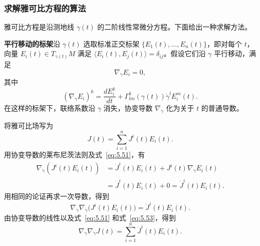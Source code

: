 \subsubsection{求解雅可比方程的算法}
雅可比方程是沿测地线 $\gamma(t)$ 的二阶线性常微分方程。下面给出一种求解方法。

\textbf{平行移动的标架}\quad 沿 $\gamma(t)$ 选取标准正交标架 $\{E_1(t),\ldots,E_n(t)\}$，即对每个 $t$，向量 $E_i(t)\in T_{\gamma(t)}M$ 满足 $\langle E_i(t),E_j(t)\rangle=\delta_{ij}$。假设它们沿 $\gamma$ 平行移动，满足
\begin{equation*}
  \nabla_{\dot\gamma}E_i=0,
  \tag{5.51}\label{eq:5.51}
\end{equation*}
其中
\[
  (\nabla_{\dot\gamma}E_i)^k
    =\frac{dE_i^k}{dt}+\Gamma^k_{lm}(\gamma(t))\dot\gamma^l E_i^m(t).
\]
在这样的标架下，联络系数沿 $\gamma$ 消失，协变导数 $\nabla_{\dot\gamma}$ 化为关于 $t$ 的普通导数。

将雅可比场写为
\begin{equation*}
  J(t)=\sum_{i=1}^n J^i(t)E_i(t).
  \tag{5.52}\label{eq:5.52}
\end{equation*}
用协变导数的莱布尼茨法则及式~\eqref{eq:5.51}，有
\[
  \begin{aligned}
    \nabla_{\dot\gamma}(J^i(t)E_i(t))
       &=\dot J^i(t)E_i(t)+J^i(t)\nabla_{\dot\gamma}E_i(t)\\
       &=\dot J^i(t)E_i(t)+0=\dot J^i(t)E_i(t).
  \end{aligned}
\]
用相同的论证再求一次导数，得到
\begin{equation*}
  \nabla_{\dot\gamma}\nabla_{\dot\gamma}\bigl(J^i(t)E_i(t)\bigr)
     =\ddot J^i(t)E_i(t).
  \tag{5.53}\label{eq:5.53}
\end{equation*}
由协变导数的线性以及式~\eqref{eq:5.51} 和式~\eqref{eq:5.53}，得到
\begin{equation*}
  \nabla_{\dot\gamma}\nabla_{\dot\gamma}J(t)
     =\sum_{i=1}^n\ddot J^i(t)E_i(t).
  \tag{5.54}\label{eq:5.54}
\end{equation*}

